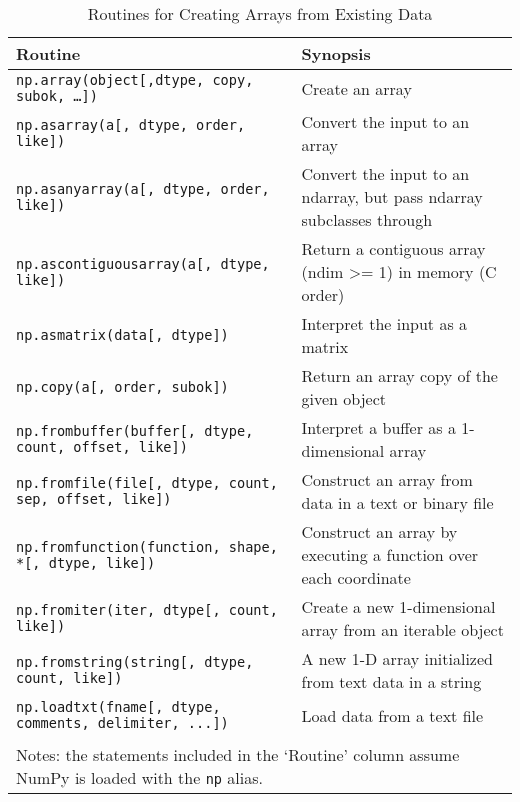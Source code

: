 \documentclass[a4paper,11pt]{book}
\numberwithin{figure}{chapter}
\numberwithin{table}{chapter}
\begin{document}
\begin{sidewaystable}[!htbp]
	\centering
	\caption{Routines for Creating Arrays from Existing Data}
	\label{tab:array_from_existing_data}
	\begin{tabular}{lp{12cm}}
		\toprule \toprule
			Routine & Synopsis \\
			\midrule
			\texttt{np.array(object[,dtype, copy, subok, \ldots])}
			& Create an array \\
			\texttt{np.asarray(a[, dtype, order, like])} 
			& Convert the input to an array \\ 
			\texttt{np.asanyarray(a[, dtype, order, like])} 
			&  Convert the input to an ndarray, but pass ndarray subclasses through \\
                        \texttt{np.ascontiguousarray(a[, dtype, like])}
			& Return a contiguous array (ndim >= 1) in memory (C order)\\
                        \texttt{np.asmatrix(data[, dtype])}
                        & Interpret the input as a matrix\\
                        \texttt{np.copy(a[, order, subok])}
                        & Return an array copy of the given object\\
                        \texttt{np.frombuffer(buffer[, dtype, count, offset, like])}
                        & Interpret a buffer as a 1-dimensional array\\
                        \texttt{np.fromfile(file[, dtype, count, sep, offset, like])}
                        & Construct an array from data in a text or binary file\\
                        \texttt{np.fromfunction(function, shape, *[, dtype, like])}
                        & Construct an array by executing a function over each coordinate\\
                        \texttt{np.fromiter(iter, dtype[, count, like])}
                        & Create a new 1-dimensional array from an iterable object\\
                        \texttt{np.fromstring(string[, dtype, count, like])}
                        & A new 1-D array initialized from text data in a string\\
                        \texttt{np.loadtxt(fname[, dtype, comments, delimiter, ...])}
                        & Load data from a text file\\
	     				\bottomrule \\[-1.8ex]
						\multicolumn{2}{l}{Notes: the statements included in the `Routine' column assume NumPy is loaded with the \texttt{np} alias.} \\
	\end{tabular}
\end{sidewaystable}
\clearpage
\end{document}
